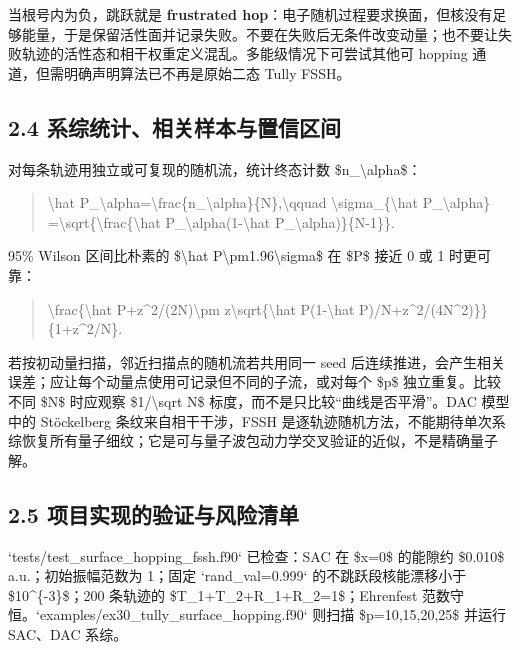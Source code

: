 \documentclass[UTF8,openany,11pt,fontset=fandol]{ctexbook}
\begin{document}
当根号内为负，跳跃就是 \textbf{frustrated
hop}：电子随机过程要求换面，但核没有足够能量，于是保留活性面并记录失败。不要在失败后无条件改变动量；也不要让失败轨迹的活性态和相干权重定义混乱。多能级情况下可尝试其他可
hopping 通道，但需明确声明算法已不再是原始二态 Tully FSSH。

\subsection{\texorpdfstring{\textbf{2.4
系综统计、相关样本与置信区间}}{2.4 系综统计、相关样本与置信区间}}\label{ux7cfbux7efcux7edfux8ba1ux76f8ux5173ux6837ux672cux4e0eux7f6eux4fe1ux533aux95f4}

对每条轨迹用独立或可复现的随机流，统计终态计数
\$n\_\textbackslash alpha\$：

\begin{quote}
\textbackslash hat
P\_\textbackslash alpha=\textbackslash frac\{n\_\textbackslash alpha\}\{N\},\textbackslash qquad
\textbackslash sigma\_\{\textbackslash hat P\_\textbackslash alpha\}
=\textbackslash sqrt\{\textbackslash frac\{\textbackslash hat
P\_\textbackslash alpha(1-\textbackslash hat
P\_\textbackslash alpha)\}\{N-1\}\}.
\end{quote}

95\% Wilson 区间比朴素的 \$\textbackslash hat
P\textbackslash pm1.96\textbackslash sigma\$ 在 \$P\$ 接近 0 或 1
时更可靠：

\begin{quote}
\textbackslash frac\{\textbackslash hat P+z\^{}2/(2N)\textbackslash pm
z\textbackslash sqrt\{\textbackslash hat P(1-\textbackslash hat
P)/N+z\^{}2/(4N\^{}2)\}\} \{1+z\^{}2/N\}.
\end{quote}

若按初动量扫描，邻近扫描点的随机流若共用同一 seed
后连续推进，会产生相关误差；应让每个动量点使用可记录但不同的子流，或对每个
\$p\$ 独立重复。比较不同 \$N\$ 时应观察 \$1/\textbackslash sqrt N\$
标度，而不是只比较``曲线是否平滑''。DAC 模型中的 Stöckelberg
条纹来自相干干涉，FSSH
是逐轨迹随机方法，不能期待单次系综恢复所有量子细纹；它是可与量子波包动力学交叉验证的近似，不是精确量子解。

\subsection{\texorpdfstring{\textbf{2.5
项目实现的验证与风险清单}}{2.5 项目实现的验证与风险清单}}\label{ux9879ux76eeux5b9eux73b0ux7684ux9a8cux8bc1ux4e0eux98ceux9669ux6e05ux5355}

`tests/test\_surface\_hopping\_fssh.f90` 已检查：SAC 在 \$x=0\$ 的能隙约
\$0.010\$ a.u.；初始振幅范数为 1；固定 `rand\_val=0.999`
的不跳跃段核能漂移小于 \$10\^{}\{-3\}\$；200 条轨迹的
\$T\_1+T\_2+R\_1+R\_2=1\$；Ehrenfest
范数守恒。`examples/ex30\_tully\_surface\_hopping.f90` 则扫描
\$p=10,15,20,25\$ 并运行 SAC、DAC 系综。
\end{document}
